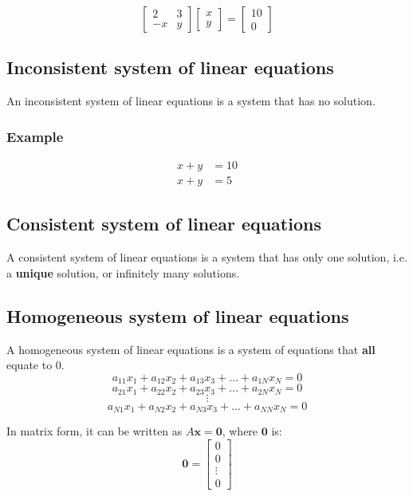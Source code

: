 \documentclass[11pt]{article}
\begin{document}
\begin{displaymath}
\begin{bmatrix}
2 & 3 \\
-x & y
\end{bmatrix} \begin{bmatrix}
x \\
y
\end{bmatrix} = \begin{bmatrix}
10 \\
0
\end{bmatrix}
\end{displaymath}

\subsection{Inconsistent system of linear equations}
\label{sec:org1b07fdd}
An inconsistent system of linear equations is a system that has no solution.

\subsubsection{Example}
\label{sec:org6a23675}
\begin{align*}
x + y &= 10 \\
x + y &= 5
\end{align*}

\subsection{Consistent system of linear equations}
\label{sec:org878997b}
A consistent system of linear equations is a system that has only one solution, i.e. a \textbf{unique} solution, or infinitely many solutions.

 \newpage

\subsection{Homogeneous system of linear equations}
\label{sec:org64c35b8}
A homogeneous system of linear equations is a system of equations that \textbf{all} equate to 0.
\[a_{11}x_1 + a_{12}x_2 + a_{13}x_3 + \ldots + a_{1N}x_{N} = 0\]
\[a_{21}x_1 + a_{22}x_2 + a_{23}x_3 + \ldots + a_{2N}x_{N} = 0\]
\[\vdots\]
\[a_{N1}x_1 + a_{N2}x_2 + a_{N3}x_3 + \ldots + a_{NN}x_{N} = 0\]

In matrix form, it can be written as \(A \boldsymbol{x} = \boldsymbol{0}\), where \(\boldsymbol{0}\) is:
\begin{displaymath}
\boldsymbol{0} = \begin{bmatrix}
0 \\
0 \\
\vdots \\
0
\end{bmatrix}
\end{displaymath}
\end{document}
